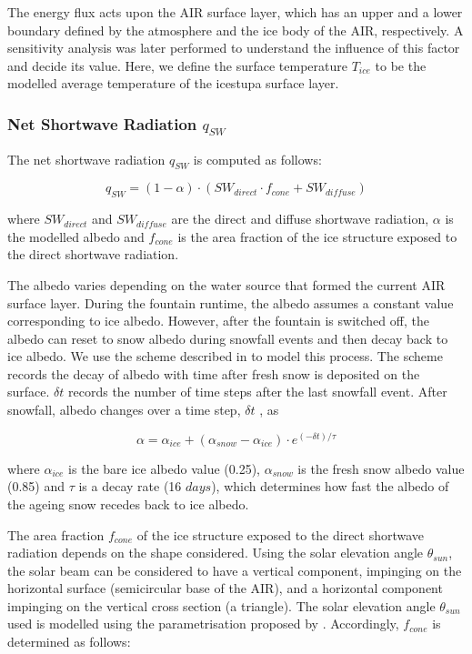 \documentclass[utf8]{frontiersSCNS}
\begin{document}
The energy flux acts upon the AIR surface layer, which has an upper and a lower boundary defined by the
atmosphere and the ice body of the AIR, respectively.  A sensitivity analysis was later performed
to understand the influence of this factor and decide its value. Here, we define the surface temperature
$T_{ice}$ to be the modelled average temperature of the icestupa surface layer.

\subsubsection{Net Shortwave Radiation \texorpdfstring{$q_{SW}$}{Lg}}

The net shortwave radiation $q_{SW}$ is computed as follows:

\begin{equation} q_{SW} = (1- \alpha)\cdot (SW_{direct} \cdot f_{cone} + SW_{diffuse}) \label{eqn:SW} \end{equation}

where $SW_{direct}$ and $SW_{diffuse}$ are the direct and diffuse shortwave radiation, $\alpha$ is the
modelled albedo and $f_{cone}$ is the area fraction of the ice structure exposed to the direct shortwave
radiation.

The albedo varies depending on the water source that formed the current AIR surface layer. During the fountain
runtime, the albedo assumes a constant value corresponding to ice albedo. However, after the fountain is
switched off, the albedo can reset to snow albedo during snowfall events and then decay back to ice albedo. We
use the scheme described in \cite{OerlemansKnap_1998} to model this process. The scheme records the decay of
albedo with time after fresh snow is deposited on the surface. $\delta t$ records the number of time steps after
the last snowfall event. After snowfall, albedo changes over a time step, $\delta t$ , as

\begin{equation} \alpha=\alpha_{ice}+(\alpha_{snow}-\alpha_{ice}) \cdot e^{(-\delta t)/\tau} \label{eqn:a}
\end{equation}

where $\alpha_{ice}$ is the bare ice albedo value (0.25), $\alpha_{snow}$ is the fresh snow albedo value (0.85)
and $\tau$ is a decay rate (16 $days$), which determines how fast the albedo of the ageing snow recedes back to ice albedo.

The area fraction $f_{cone}$ of the ice structure exposed to the direct shortwave radiation depends on the shape
considered. Using the solar elevation angle $\theta_{sun}$, the solar beam can be considered to have a vertical
component, impinging on the horizontal surface (semicircular base of the AIR), and a horizontal component
impinging on the vertical cross section (a triangle). The solar elevation angle $\theta_{sun}$ used is modelled
using the parametrisation proposed by \cite{Woolf_1968}. Accordingly, $f_{cone}$ is determined as follows:
\end{document}
